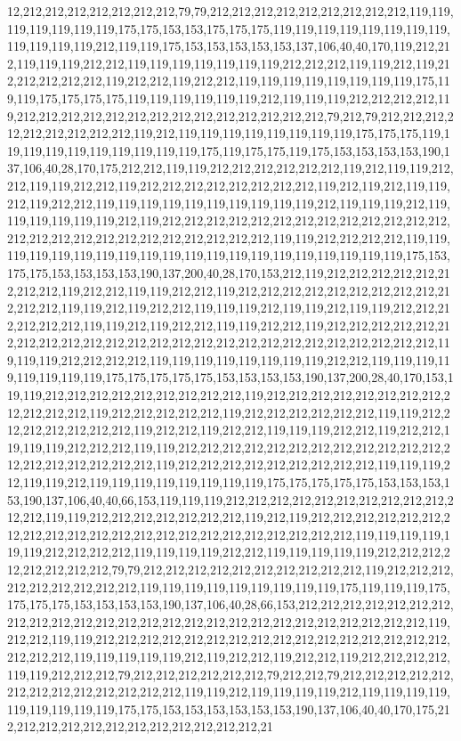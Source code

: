 12,212,212,212,212,212,212,212,79,79,212,212,212,212,212,212,212,212,212,119,119,119,119,119,119,119,175,175,153,153,175,175,175,119,119,119,119,119,119,119,119,119,119,119,119,212,119,119,175,153,153,153,153,153,137,106,40,40,170,119,212,212,119,119,119,212,212,119,119,119,119,119,119,119,212,212,212,119,119,212,119,212,212,212,212,212,119,212,212,119,212,212,119,119,119,119,119,119,119,119,175,119,119,175,175,175,175,119,119,119,119,119,119,212,119,119,119,212,212,212,212,119,212,212,212,212,212,212,212,212,212,212,212,212,212,212,79,212,79,212,212,212,212,212,212,212,212,212,119,212,119,119,119,119,119,119,119,119,175,175,175,119,119,119,119,119,119,119,119,119,119,175,119,175,175,119,175,153,153,153,153,190,137,106,40,28,170,175,212,212,119,119,212,212,212,212,212,212,119,212,119,119,212,212,119,119,212,212,119,212,212,212,212,212,212,212,212,119,212,119,212,119,119,212,119,212,212,119,119,119,119,119,119,119,119,119,119,212,119,119,119,212,119,119,119,119,119,119,212,119,212,212,212,212,212,212,212,212,212,212,212,212,212,212,212,212,212,212,212,212,212,212,212,212,212,119,119,212,212,212,212,119,119,119,119,119,119,119,119,119,119,119,119,119,119,119,119,119,119,119,119,175,153,175,175,153,153,153,153,190,137,200,40,28,170,153,212,119,212,212,212,212,212,212,212,212,119,212,212,119,119,212,212,119,212,212,212,212,212,212,212,212,212,212,212,212,119,119,212,119,212,212,119,119,119,212,119,119,212,119,119,212,212,212,212,212,212,119,119,212,119,212,212,119,119,212,212,119,212,212,212,212,212,212,212,212,212,212,212,212,212,212,212,212,212,212,212,212,212,212,212,212,212,119,119,119,212,212,212,212,119,119,119,119,119,119,119,119,212,212,119,119,119,119,119,119,119,119,175,175,175,175,175,153,153,153,153,190,137,200,28,40,170,153,119,119,212,212,212,212,212,212,212,212,212,119,212,212,212,212,212,212,212,212,212,212,212,212,119,212,212,212,212,212,119,212,212,212,212,212,212,119,119,212,212,212,212,212,212,212,119,212,212,119,212,212,119,119,119,212,212,119,212,212,119,119,119,212,212,212,119,119,212,212,212,212,212,212,212,212,212,212,212,212,212,212,212,212,212,212,212,119,212,212,212,212,212,212,212,212,212,119,119,119,212,119,119,212,119,119,119,119,119,119,119,119,175,175,175,175,175,153,153,153,153,190,137,106,40,40,66,153,119,119,119,212,212,212,212,212,212,212,212,212,212,212,212,119,119,212,212,212,212,212,212,212,119,212,119,212,212,212,212,212,212,212,212,212,212,212,212,212,212,212,212,212,212,212,212,212,212,119,119,119,119,119,119,212,212,212,212,119,119,119,119,212,212,119,119,119,119,119,212,212,212,212,212,212,212,212,79,79,212,212,212,212,212,212,212,212,212,212,119,212,212,212,212,212,212,212,212,212,119,119,119,119,119,119,119,119,119,175,119,119,119,175,175,175,175,153,153,153,153,190,137,106,40,28,66,153,212,212,212,212,212,212,212,212,212,212,212,212,212,212,212,212,212,212,212,212,212,212,212,212,212,212,119,212,212,119,119,212,212,212,212,212,212,212,212,212,212,212,212,212,212,212,212,212,212,212,119,119,119,119,119,212,119,212,212,119,212,212,119,212,212,212,212,119,119,212,212,212,79,212,212,212,212,212,212,79,212,212,79,212,212,212,212,212,212,212,212,212,212,212,212,212,119,119,212,119,119,119,119,212,119,119,119,119,119,119,119,119,119,175,175,153,153,153,153,153,153,190,137,106,40,40,170,175,212,212,212,212,212,212,212,212,212,212,212,212,21